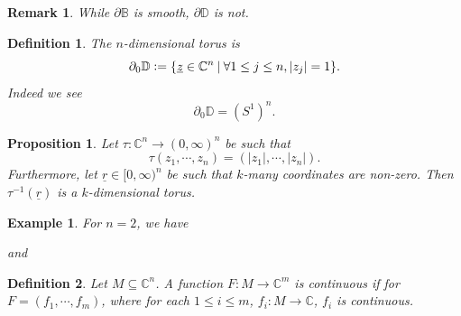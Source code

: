 \documentclass{article}
\newtheorem{proposition}{Proposition}[section]
\newtheorem{definition}{Definition}[section]
\newtheorem{remark}{Remark}[section]
\newtheorem{example}{Example}[section]
\newcommand{\defeq}{\vcentcolon=}
\newcommand{\C}[0]{\mathbb{C}}
\begin{document}
\begin{remark}
While $\partial\mathbb{B}$ is smooth, $\partial\mathbb{D}$ is not.
\end{remark}

\begin{definition}
The $n$-dimensional torus is
\begin{equation*}
\partial_0\mathbb{D}\defeq\{\underline{z}\in\C^n\:|\: \forall 1\leq j\leq n, \vert z_j\vert = 1\}.
\end{equation*}
Indeed we see
\begin{equation*}
\partial_0\mathbb{D} = (S^1)^n.
\end{equation*}
\end{definition}

\begin{proposition}
Let $\tau:\C^n\to(0,\infty)^n$ be such that 
\begin{equation*}
\tau(z_1,\cdots,z_n)=(\vert z_1\vert,\cdots,\vert z_n\vert).
\end{equation*}
Furthermore, let $\underline{r}\in[0,\infty)^n$ be such that $k$-many coordinates are non-zero. Then $\tau^{-1}(\underline{r})$ is a $k$-dimensional torus.
\end{proposition}

\begin{example}
For $n=2$, we have
\begin{center}
\end{center}
and 
\begin{center}
\end{center}
\end{example}

\begin{definition}
Let $M\subseteq\C^n$. A function $F:M\to \C^m$ is continuous if for $F=(f_1,\cdots,f_m)$, where for each $1\leq i\leq m$, $f_i:M\to\C$, $f_i$ is continuous.
\end{definition}
\end{document}
